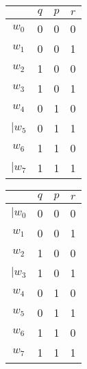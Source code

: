 \documentclass[a4paper,12pt,parskip=half]{scrartcl}
\begin{document}
\begin{tabular}{|c|ccc|}
    \hline
    \end{tabular}\begin{tabular}{|c|ccc|}
    \hline 
              & $q$ & $p$ & $r$ \\ 
    \hline 
       $w_0$  &  0  &  0  &  0  \\ 
\sout{$w_1$}  &  0  &  0  &  1  \\ 
       $w_2$  &  1  &  0  &  0  \\ 
       $w_3$  &  1  &  0  &  1  \\ 
       $w_4$  &  0  &  1  &  0  \\ 
      $|w_5$  &  0  &  1  &  1  \\ 
       $w_6$  &  1  &  1  &  0  \\ 
      $|w_7$  &  1  &  1  &  1  \\ 
    \hline
    \end{tabular}\begin{tabular}{|c|ccc|}
    \hline 
              & $q$ & $p$ & $r$ \\ 
    \hline 
      $|w_0$  &  0  &  0  &  0  \\ 
\sout{$w_1$}  &  0  &  0  &  1  \\ 
       $w_2$  &  1  &  0  &  0  \\ 
      $|w_3$  &  1  &  0  &  1  \\ 
       $w_4$  &  0  &  1  &  0  \\ 
       $w_5$  &  0  &  1  &  1  \\ 
       $w_6$  &  1  &  1  &  0  \\ 
       $w_7$  &  1  &  1  &  1  \\ 
    \hline
    \end{tabular}
\end{document}
